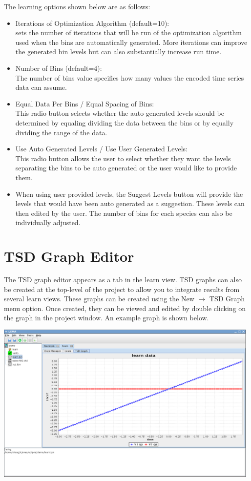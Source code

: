 \documentclass[titlepage,11pt]{article}
\begin{document}
The learning options shown below are as follows:
\begin{itemize}
\item Iterations of Optimization Algorithm (default=10): \\
sets the number of iterations that will be run of the optimization algorithm 
used when the bins are automatically generated.  More iterations can improve 
the generated bin levels but can also substantially increase run time.
\item Number of Bins (default=4): \\
The number of bins value specifies how many values the
encoded time series data can assume.
\item Equal Data Per Bins / Equal Spacing of Bins: \\
This radio button selects whether the auto generated levels
should be determined by equaling dividing the data between the
bins or by equally dividing the range of the data. 
\item Use Auto Generated Levels / Use User Generated Levels: \\
This radio button allows the user to select whether they want
the levels separating the bins to be auto generated or the user
would like to provide them. 
\item When using user provided levels, the Suggest Levels
button will provide the levels that would have been auto
generated as a suggestion. These levels can then edited by the
user.  The number of bins for each species can also be individually adjusted.  
\end{itemize}

\section{\label{TSDEdit}TSD Graph Editor}

\noindent
The TSD graph editor appears as a tab in the learn
view.  TSD graphs can also be created at the top-level of the project
to allow you to integrate results from several learn
views. These graphs can be created using the New $\rightarrow$ TSD Graph
menu option. Once created, they can be viewed and edited by double
clicking on the graph in the project window.  An example graph is
shown below.
\begin{center}
\includegraphics[height=80mm]{screenshots/TSDgraphLema}
\end{center}
\end{document}

